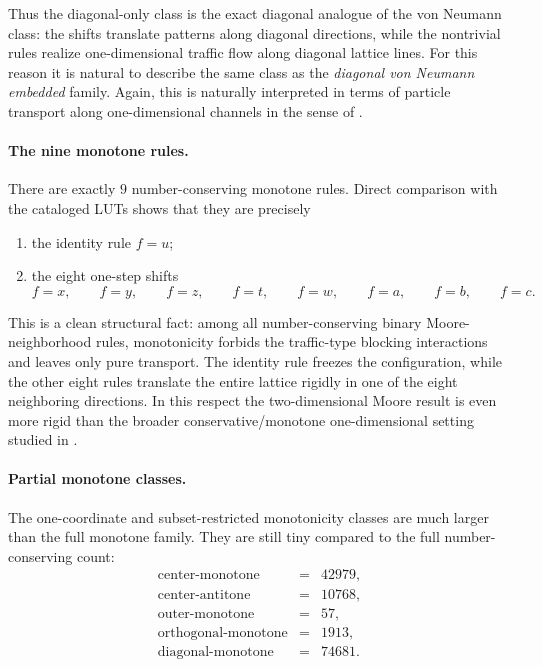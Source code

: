 \documentclass[11pt,a4paper]{article}
\begin{document}
Thus the diagonal-only class is the exact diagonal analogue of the von Neumann class: the shifts
translate patterns along diagonal directions, while the nontrivial rules realize one-dimensional
traffic flow along diagonal lattice lines.  For this reason it is natural to describe the same
class as the \emph{diagonal von Neumann embedded} family.  Again, this is naturally interpreted
in terms of particle transport along one-dimensional channels in the sense of
\cite{MoreiraBoccaraGoles2004}.

\paragraph{The nine monotone rules.}
There are exactly \(9\) number-conserving monotone rules.  Direct comparison with the cataloged
LUTs shows that they are precisely
\begin{enumerate}
\item the identity rule \(f=u\);
\item the eight one-step shifts
\[
f=x,\qquad f=y,\qquad f=z,\qquad f=t,\qquad
f=w,\qquad f=a,\qquad f=b,\qquad f=c.
\]
\end{enumerate}

This is a clean structural fact: among all number-conserving binary Moore-neighborhood rules,
monotonicity forbids the traffic-type blocking interactions and leaves only pure transport.
The identity rule freezes the configuration, while the other eight rules translate the entire
lattice rigidly in one of the eight neighboring directions.  In this respect the two-dimensional
Moore result is even more rigid than the broader conservative/monotone one-dimensional setting
studied in \cite{MoreiraBoccaraGoles2004,GolesMoreiraRapaport2011}.

\paragraph{Partial monotone classes.}
The one-coordinate and subset-restricted monotonicity classes are much larger than the full
monotone family.  They are still tiny compared to the full number-conserving count:
\[
\begin{array}{rcl}
\text{center-monotone} &=& 42979,\\
\text{center-antitone} &=& 10768,\\
\text{outer-monotone} &=& 57,\\
\text{orthogonal-monotone} &=& 1913,\\
\text{diagonal-monotone} &=& 74681.
\end{array}
\]
\end{document}

